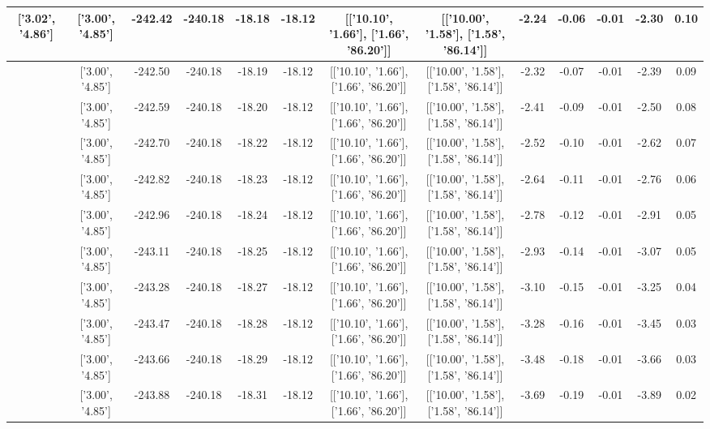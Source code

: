 \begin{table}[htbp]
\begin{adjustbox}{angle=90}
\begin{tabular}{|c|c|c|c|c|c|c|c|c|c|c|c|c|}
 ['3.02', '4.86'] & ['3.00', '4.85'] & -242.42 & -240.18 & -18.18 & -18.12 & [['10.10', '1.66'], ['1.66', '86.20']] & [['10.00', '1.58'], ['1.58', '86.14']] & -2.24 & -0.06 & -0.01 & -2.30 & 0.10\\ \hline
 ['3.02', '4.86'] & ['3.00', '4.85'] & -242.50 & -240.18 & -18.19 & -18.12 & [['10.10', '1.66'], ['1.66', '86.20']] & [['10.00', '1.58'], ['1.58', '86.14']] & -2.32 & -0.07 & -0.01 & -2.39 & 0.09\\ \hline
 ['3.03', '4.86'] & ['3.00', '4.85'] & -242.59 & -240.18 & -18.20 & -18.12 & [['10.10', '1.66'], ['1.66', '86.20']] & [['10.00', '1.58'], ['1.58', '86.14']] & -2.41 & -0.09 & -0.01 & -2.50 & 0.08\\ \hline
 ['3.03', '4.86'] & ['3.00', '4.85'] & -242.70 & -240.18 & -18.22 & -18.12 & [['10.10', '1.66'], ['1.66', '86.20']] & [['10.00', '1.58'], ['1.58', '86.14']] & -2.52 & -0.10 & -0.01 & -2.62 & 0.07\\ \hline
 ['3.03', '4.86'] & ['3.00', '4.85'] & -242.82 & -240.18 & -18.23 & -18.12 & [['10.10', '1.66'], ['1.66', '86.20']] & [['10.00', '1.58'], ['1.58', '86.14']] & -2.64 & -0.11 & -0.01 & -2.76 & 0.06\\ \hline
 ['3.04', '4.86'] & ['3.00', '4.85'] & -242.96 & -240.18 & -18.24 & -18.12 & [['10.10', '1.66'], ['1.66', '86.20']] & [['10.00', '1.58'], ['1.58', '86.14']] & -2.78 & -0.12 & -0.01 & -2.91 & 0.05\\ \hline
 ['3.04', '4.86'] & ['3.00', '4.85'] & -243.11 & -240.18 & -18.25 & -18.12 & [['10.10', '1.66'], ['1.66', '86.20']] & [['10.00', '1.58'], ['1.58', '86.14']] & -2.93 & -0.14 & -0.01 & -3.07 & 0.05\\ \hline
 ['3.04', '4.86'] & ['3.00', '4.85'] & -243.28 & -240.18 & -18.27 & -18.12 & [['10.10', '1.66'], ['1.66', '86.20']] & [['10.00', '1.58'], ['1.58', '86.14']] & -3.10 & -0.15 & -0.01 & -3.25 & 0.04\\ \hline
 ['3.05', '4.86'] & ['3.00', '4.85'] & -243.47 & -240.18 & -18.28 & -18.12 & [['10.10', '1.66'], ['1.66', '86.20']] & [['10.00', '1.58'], ['1.58', '86.14']] & -3.28 & -0.16 & -0.01 & -3.45 & 0.03\\ \hline
 ['3.05', '4.86'] & ['3.00', '4.85'] & -243.66 & -240.18 & -18.29 & -18.12 & [['10.10', '1.66'], ['1.66', '86.20']] & [['10.00', '1.58'], ['1.58', '86.14']] & -3.48 & -0.18 & -0.01 & -3.66 & 0.03\\ \hline
 ['3.06', '4.86'] & ['3.00', '4.85'] & -243.88 & -240.18 & -18.31 & -18.12 & [['10.10', '1.66'], ['1.66', '86.20']] & [['10.00', '1.58'], ['1.58', '86.14']] & -3.69 & -0.19 & -0.01 & -3.89 & 0.02\\ \hline

\end{tabular}
\end{adjustbox}
\end{table}
